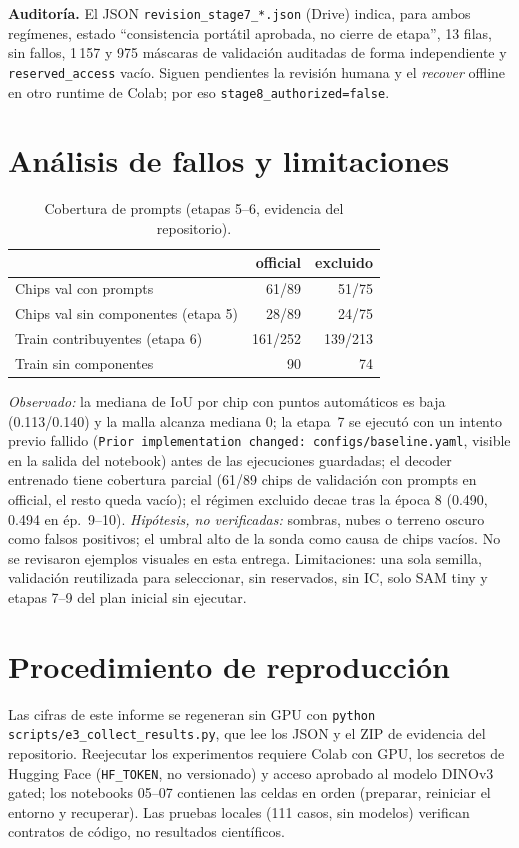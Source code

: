 \documentclass[11pt,twocolumn,a4paper]{article}
\begin{document}
\textbf{Auditor\'ia.} El JSON \texttt{revision\_stage7\_*.json} (Drive) indica, para ambos reg\'imenes, estado ``consistencia port\'atil aprobada, no cierre de etapa'', 13 filas, sin fallos, 1\,157 y 975 m\'ascaras de validaci\'on auditadas de forma independiente y \texttt{reserved\_access} vac\'io. Siguen pendientes la revisi\'on humana y el \emph{recover} offline en otro runtime de Colab; por eso \texttt{stage8\_authorized=false}.

\section{An\'alisis de fallos y limitaciones}
\begin{table}[h]\centering\footnotesize\caption{Cobertura de prompts (etapas 5--6, evidencia del repositorio).}
\begin{tabular}{@{}p{3.3cm}rr@{}}\toprule
& official & excluido\\\midrule
Chips val con prompts & 61/89 & 51/75\\
Chips val sin componentes (etapa 5) & 28/89 & 24/75\\
Train contribuyentes (etapa 6) & 161/252 & 139/213\\
Train sin componentes & 90 & 74\\\bottomrule
\end{tabular}\end{table}

\emph{Observado:} la mediana de IoU por chip con puntos autom\'aticos es baja (0.113/0.140) y la malla alcanza mediana 0; la etapa~7 se ejecut\'o con un intento previo fallido (\texttt{Prior implementation changed: configs/baseline.yaml}, visible en la salida del notebook) antes de las ejecuciones guardadas; el decoder entrenado tiene cobertura parcial (61/89 chips de validaci\'on con prompts en official, el resto queda vac\'io); el r\'egimen excluido decae tras la \'epoca 8 (0.490, 0.494 en \'ep.~9--10). \emph{Hip\'otesis, no verificadas:} sombras, nubes o terreno oscuro como falsos positivos; el umbral alto de la sonda como causa de chips vac\'ios. No se revisaron ejemplos visuales en esta entrega. Limitaciones: una sola semilla, validaci\'on reutilizada para seleccionar, sin reservados, sin IC, solo SAM tiny y etapas 7--9 del plan inicial sin ejecutar.

\section{Procedimiento de reproducci\'on}
Las cifras de este informe se regeneran sin GPU con \texttt{python scripts/e3\_collect\_results.py}, que lee los JSON y el ZIP de evidencia del repositorio. Reejecutar los experimentos requiere Colab con GPU, los secretos de Hugging Face (\texttt{HF\_TOKEN}, no versionado) y acceso aprobado al modelo DINOv3 gated; los notebooks 05--07 contienen las celdas en orden (preparar, reiniciar el entorno y recuperar). Las pruebas locales (111 casos, sin modelos) verifican contratos de c\'odigo, no resultados cient\'ificos.
\end{document}
